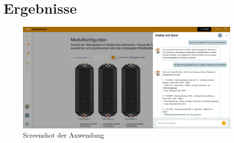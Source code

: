 \chapter{Ergebnisse}\label{ch:ergebnisse}
\begin{figure}[H]
    \begin{center}
        \includegraphics[width=14cm]{bilder/chatbot.png}
        \caption{Screenshot der Anwendung}\label{fig:bodentank}
    \end{center}
\end{figure}

